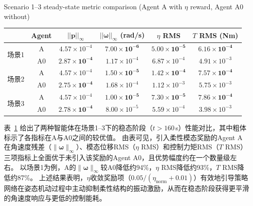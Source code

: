 \begin{table}[htbp]
\centering
{}
         {Scenario 1--3 steady-state metric comparison (Agent A with $\eta$ reward, Agent A0 without)}
\label{tab:scenario1-3}
\small
\begin{tabular}{lccccc}
\toprule
& Agent
& $||\mathbf{p}||_\infty$
& $||\boldsymbol{\omega}||_\infty$ (rad/s)
& $\eta$ RMS
& $T$ RMS (Nm) \\
\midrule
\multirow{2}{*}{场景1} &A   &          $4.57{\times}10^{-4}$  & $\mathbf{7.00{\times}10^{-6}}$ & $\mathbf{5.00{\times}10^{-5}}$ & $\mathbf{6.16{\times}10^{-4}}$ \\
                       &A0  & $\mathbf{2.87{\times}10^{-4}}$ &          $1.17{\times}10^{-4}$  &          $6.87{\times}10^{-4}$  &          $4.91{\times}10^{-3}$ \\
\cmidrule(lr){1-6}
\multirow{2}{*}{场景2} &A   &          $4.57{\times}10^{-4}$  & $\mathbf{1.50{\times}10^{-5}}$ & $\mathbf{1.42{\times}10^{-4}}$ & $\mathbf{7.57{\times}10^{-4}}$ \\
                       &A0  & $\mathbf{2.75{\times}10^{-4}}$ &          $1.68{\times}10^{-4}$  &          $1.12{\times}10^{-3}$  &          $5.75{\times}10^{-3}$ \\
\cmidrule(lr){1-6}
\multirow{2}{*}{场景3} &A   &          $4.57{\times}10^{-4}$  & $\mathbf{1.00{\times}10^{-5}}$ & $\mathbf{7.30{\times}10^{-5}}$ & $\mathbf{7.86{\times}10^{-4}}$ \\
                       &A0  & $\mathbf{2.78{\times}10^{-4}}$ &          $8.00{\times}10^{-5}$  &          $5.59{\times}10^{-4}$  &          $3.98{\times}10^{-3}$ \\
\bottomrule
\end{tabular}
\end{table}

\noindent 表~\ref{tab:scenario1-3} 给出了两种智能体在场景1--3下的稳态阶段（$t>160$\,s）性能对比，其中粗体标示了各指标在A与A0之间的较优值。
由表可见，引入柔性模态奖励的Agent A在角速度残差（$\|\boldsymbol{\omega}\|_\infty$）、模态位移RMS（$\eta$ RMS）和控制力矩RMS（$T$ RMS）三项指标上全面优于未引入该奖励的Agent A0，且优势幅度约在一个数量级左右。
以场景1为例，A的$\|\boldsymbol{\omega}\|_\infty$较A0降低约94\%，$\eta$ RMS降低约93\%，$T$ RMS降低约87\%。
上述结果表明，$\eta$收敛奖励项（$0.05/(\eta_\text{norm}+0.01)$）有效地引导策略网络在姿态机动过程中主动抑制柔性结构的振动激励，从而在稳态阶段获得更平滑的角速度响应与更低的控制能耗。

